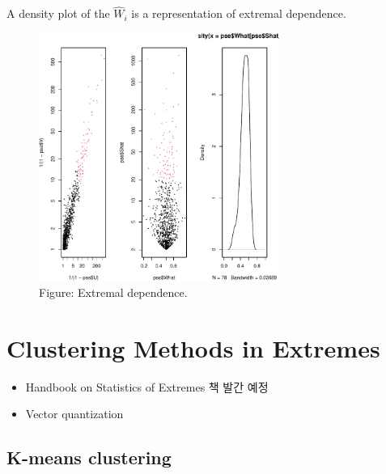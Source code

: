 \documentclass[
  13pt,
  letterpaper,
  DIV=11,
  numbers=noendperiod]{scrreprt}
\theoremstyle{definition}
\theoremstyle{plain}
\theoremstyle{definition}
\theoremstyle{plain}
\theoremstyle{plain}
\theoremstyle{definition}
\theoremstyle{remark}
\begin{document}
A density plot of the \(\hat{W}_i\) is a representation of extremal
dependence.

\begin{figure}[th]

{\centering \includegraphics[width=0.7\textwidth,height=\textheight]{mev_files/figure-pdf/unnamed-chunk-1-1.pdf}

}

\caption{Figure: Extremal dependence.}

\end{figure}%

\section{Clustering Methods in
Extremes}\label{clustering-methods-in-extremes}

\begin{itemize}
\item
  Handbook on Statistics of Extremes 책 발간 예정
\item
  Vector quantization
\end{itemize}

\subsection{K-means clustering}\label{k-means-clustering}
\end{document}
